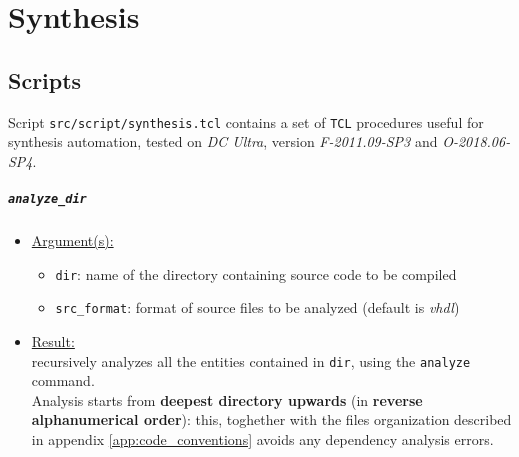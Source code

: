 \chapter{Synthesis}
\label{chap:synthesis}

\lstset{
	basicstyle=\tiny,
	frame=single,
	breaklines=true
}

\section{Scripts}
Script \texttt{src/script/synthesis.tcl} contains a set of \texttt{TCL}
procedures useful for synthesis automation, tested on
\textit{DC Ultra}, version \textit{F-2011.09-SP3} and \textit{O-2018.06-SP4}.

\paragraph{\texttt{analyze\_dir}}
\begin{itemize}
	\item \underline{Argument(s):}
		\begin{itemize}
			\item \texttt{dir}: name of the directory containing
				source code to be compiled
			\item \texttt{src\_format}: format of source files
				to be analyzed (default is \textit{vhdl})
		\end{itemize}
	\item \underline{Result:} \\
		recursively analyzes all the entities contained in \texttt{dir},
		using the \texttt{analyze} command. \\
		Analysis starts from \textbf{deepest directory upwards} (in
		\textbf{reverse alphanumerical order}): this, toghether with the
		files organization described in appendix
		\ref{app:code_conventions} avoids any dependency analysis errors.
\end{itemize}

